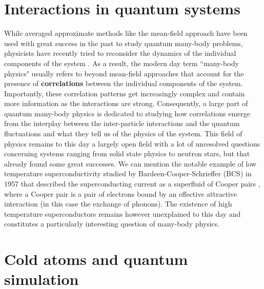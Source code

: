 \section*{Interactions in quantum systems}

While averaged approximate methods like the mean-field approach have been used with great success in the past to study quantum many-body problems, physicists have recently tried to reconsider the dynamics of the individual components of the system \cite{lavoine2021,papp2008bragg,schweigler2017experimental,wenz2013few}. As a result, the modern day term ``many-body physics" usually refers to beyond mean-field approaches that account for the presence of \textbf{correlations} between the individual components of the system. Importantly, these correlation patterns get increasingly complex and contain more information as the interactions are strong. Consequently, a large part of quantum many-body physics is dedicated to studying how correlations emerge from the interplay between the inter-particle interactions and the quantum fluctuations and what they tell us of the physics of the system. This field of physics remains to this day a largely open field with a lot of unresolved questions concerning systems ranging from solid state physics to neutron stars, but that already found some great successes. We can mention the notable example of low temperature superconductivity studied by Bardeen-Cooper-Schrieffer \cite{bardeen1957theory} (BCS) in 1957 that described the superconducting current as a superfluid of Cooper pairs \cite{cooper1956bound}, where a Cooper pair is a pair of electrons bound by an effective attractive interaction (in this case the exchange of phonons). The existence of high temperature superconductors remains however unexplained to this day and constitutes a particularly interesting question of many-body physics.

\section*{Cold atoms and quantum simulation}

